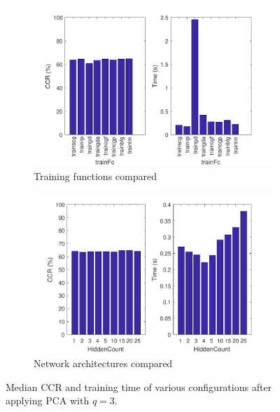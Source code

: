 \documentclass[a4, 10pt, twoside, twocolumn]{article}
\numberwithin{figure}{section}
\begin{document}
\begin{figure}[t]
    \begin{subfigure}{0.49\linewidth}
        \includegraphics[width=\linewidth]{img/WineResultsPCA.pdf}
        \caption{Training functions compared}
        \label{fig:WineResultsPCA}
    \end{subfigure}
    \begin{subfigure}{0.49\linewidth}
        \includegraphics[width=\linewidth]{img/WineResultsArchPCA.pdf}
        \caption{Network architectures compared}
        \label{fig:WineResultsArchPCA}
    \end{subfigure}
     \caption{Median CCR and training time of various configurations after applying PCA with $q=3$.}
\end{figure}
\end{document}
